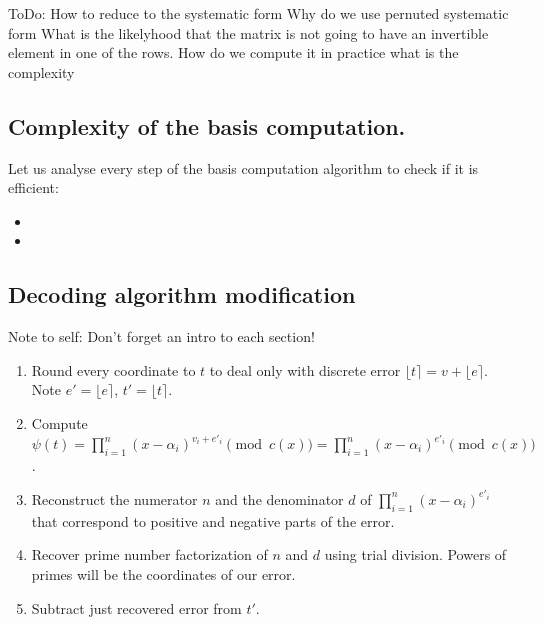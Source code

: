 \documentclass[12pt]{article}
\begin{document}
ToDo:
How to reduce to the systematic form
Why do we use pernuted systematic form
What is the likelyhood that the matrix is not going to have an invertible element in one of the rows.
How do we compute it in practice what is the complexity



\subsection{Complexity of the basis computation.}
\label{subsec:complexity_polynomials}


Let us analyse every step of the basis computation algorithm to check if it is efficient:
\begin{itemize}
    \item
    \item
\end{itemize}

\subsection{Decoding algorithm modification}
\label{subsec:decoding_polynomials}

Note to self: Don't forget an intro to each section!

\begin{enumerate}
    \item Round every coordinate to $t$ to deal only with discrete error $\lfloor t \rceil = v + \lfloor e \rceil$. Note $e' = \lfloor e \rceil$, $t' = \lfloor t \rceil$.
    \item Compute $\psi(t) = \prod_{i=1}^{n}(x - \alpha_{i})^{v_{i} + e'_i} \pmod{c(x)} = \prod_{i=1}^{n}(x - \alpha_{i})^{e'_i} \pmod{c(x)}$.
    \item \label{step:rfr} Reconstruct the numerator $n$ and the denominator $d$ of $\prod_{i=1}^{n}(x - \alpha_{i})^{e'_i}$ that correspond to positive and negative parts of the error.
    \item Recover prime number factorization of $n$ and $d$ using trial division. Powers of primes will be the coordinates of our error.
    \item Subtract just recovered error from $t'$.
\end{enumerate}
\end{document}
